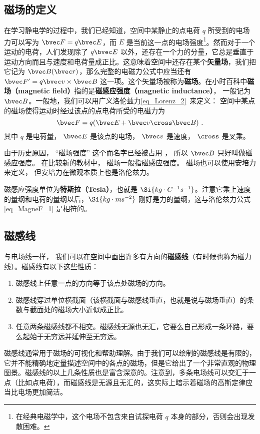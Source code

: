
\subsection{磁场的定义}
在学习静电学的过程中，我们已经知道，空间中某静止的点电荷 $q$ 所受到的电场力可以写为 $\bvec F=q\bvec E$，而 $E$ 是当前这一点的电场强度\footnote{在经典电磁学中，这个电场不包含来自试探电荷 $q$ 本身的部分，否则会出现发散困难。}。然而对于一个运动的电荷，人们发现除了 $q\bvec E$ 以外，还存在一个力的分量，它总是垂直于运动方向而且与速度和电荷量成正比。这意味着空间中还存在某个\textbf{矢量场}，我们把它记为 $\bvec B(\bvec r)$，那么完整的电磁力公式中应当还有 $\bvec F'=q\bvec v\times \bvec B$ 这一项。这个矢量场被称为\textbf{磁场}。在小时百科中\textbf{磁场（magnetic field）}指的是\textbf{磁感应强度（magnetic inductance）}， 一般记为 $\bvec B$。一般地，我们可以用广义洛伦兹力\autoref{eq_Lorenz_2}~来定义： 空间中某点的磁场使得运动时经过该点的点电荷所受的电磁力为
\begin{equation}\label{eq_MagneF_1}
\bvec F = q(\bvec E + \bvec v \cross \bvec B)~.
\end{equation}
其中 $q$ 是电荷量， $\bvec E$ 是该点的电场， $\bvec v$ 是速度， $\cross$ 是叉乘。

由于历史原因， “磁场强度” 这个而名字已经被占用%
， 所以 $\bvec B$ 只好叫做磁感应强度。 在比较新的教材中， 磁场一般指磁感应强度。 磁场也可以使用安培力来定义， 但安培力在微观本质上也是洛伦兹力。 


磁感应强度单位为\textbf{特斯拉（Tesla）}，也就是 $\Si{kg\cdot C^{-1}s^{-1}}$。注意它乘上速度的量纲和电荷的量纲以后，$\Si{kg\cdot ms^{-2}}$ 刚好是力的量纲，这与洛伦兹力公式\autoref{eq_MagneF_1} 是相符的。
\subsection{磁感线}
与电场线一样， 我们可以在空间中画出许多有方向的\textbf{磁感线}（有时候也称为磁力线）。磁感线有以下这些性质：
\begin{enumerate}
\item 磁感线上任意一点的方向等于该点处磁场的方向。
\item 磁感线穿过单位横截面（该横截面与磁感线垂直，也就是说与磁场垂直）的条数与截面处的磁场大小近似成正比。
\item 任意两条磁感线都不相交。磁感线无源也无汇，它要么自己形成一条环路，要么起始于无穷远并延伸至无穷远。
\end{enumerate}
磁感线通常用于磁场的可视化和帮助理解。由于我们可以绘制的磁感线是有限的，它并不能精确地定量描述空间中的各点的磁场，但是它给出了一个非常直观的物理图景。磁感线的以上几条性质也是富含深意的。注意到，多条电场线可以交汇于一点（比如点电荷），而磁感线是无源且无汇的，这实际上暗示着磁场的高斯定律应当比电场更加简洁。


